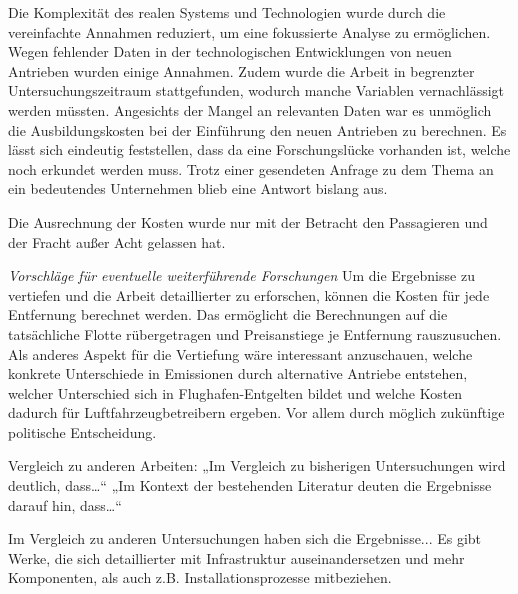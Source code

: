 Die Komplexität des realen Systems und Technologien wurde durch die vereinfachte Annahmen reduziert, um eine fokussierte Analyse zu ermöglichen.
Wegen fehlender Daten in der technologischen Entwicklungen von neuen Antrieben wurden einige Annahmen.
Zudem wurde die Arbeit in begrenzter Untersuchungszeitraum stattgefunden, wodurch manche Variablen vernachlässigt werden müssten.
%
Angesichts der Mangel an relevanten Daten war es unmöglich die Ausbildungskosten bei der Einführung den neuen Antrieben zu berechnen.
Es lässt sich eindeutig feststellen, dass da eine Forschungslücke vorhanden ist, welche noch erkundet werden muss. 
Trotz einer gesendeten Anfrage zu dem Thema an ein bedeutendes Unternehmen blieb eine Antwort bislang aus.

Die Ausrechnung der Kosten wurde nur mit der Betracht den Passagieren und der Fracht außer Acht gelassen hat. 

\textit{Vorschläge für eventuelle weiterführende Forschungen}
Um die Ergebnisse zu vertiefen und die Arbeit detaillierter zu erforschen, können die Kosten für jede Entfernung berechnet werden.
Das ermöglicht die Berechnungen auf die tatsächliche Flotte rübergetragen und Preisanstiege je Entfernung rauszusuchen.
Als anderes Aspekt für die Vertiefung wäre interessant anzuschauen, welche konkrete Unterschiede in Emissionen durch 
alternative Antriebe entstehen, welcher Unterschied sich in Flughafen-Entgelten bildet und welche Kosten dadurch
für Luftfahrzeugbetreibern ergeben. Vor allem durch möglich zukünftige politische Entscheidung.

Vergleich zu anderen Arbeiten:
„Im Vergleich zu bisherigen Untersuchungen wird deutlich, dass…“
„Im Kontext der bestehenden Literatur deuten die Ergebnisse darauf hin, dass…“

Im Vergleich zu anderen Untersuchungen haben sich die Ergebnisse...
Es gibt Werke, die sich detaillierter mit Infrastruktur auseinandersetzen und mehr Komponenten, als auch z.B. Installationsprozesse
mitbeziehen. %

